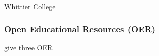 \documentclass[../../../main.tex]{subfiles}
\begin{document}
Whittier College

\subsubsection{Open Educational Resources (OER)}

give three OER 
\end{document}
